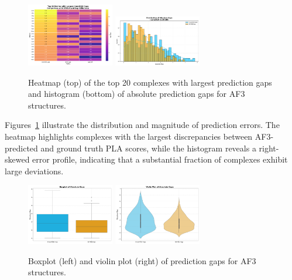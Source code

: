 \documentclass[unnumsec,webpdf,contemporary,large]{oup-authoring-template}
\theoremstyle{thmstyleone}%
\theoremstyle{thmstyletwo}%
\theoremstyle{thmstylethree}%
\begin{document}
\begin{figure}[H]
    \centering
    \includegraphics[width=0.34\textwidth]{images/top20_heatmap.png}
    \includegraphics[width=0.34\textwidth]{images/gap_histogram.png}
    \caption{Heatmap (top) of the top 20 complexes with largest prediction gaps and histogram (bottom) of absolute prediction gaps for AF3 structures.}
    \label{fig:af3_heatmap_hist}
\end{figure}

Figures~\ref{fig:af3_heatmap_hist} illustrate the distribution and magnitude of prediction errors. The heatmap highlights complexes with the largest discrepancies between AF3-predicted and ground truth PLA scores, while the histogram reveals a right-skewed error profile, indicating that a substantial fraction of complexes exhibit large deviations.

\begin{figure}[H]
    \centering
    \includegraphics[width=0.34\textwidth]{images/gap_boxplot.png}
    \includegraphics[width=0.34\textwidth]{images/gap_violinplot.png}
    \caption{Boxplot (left) and violin plot (right) of prediction gaps for AF3 structures.}
    \label{fig:af3_gap_box_violin}
\end{figure}
\end{document}
